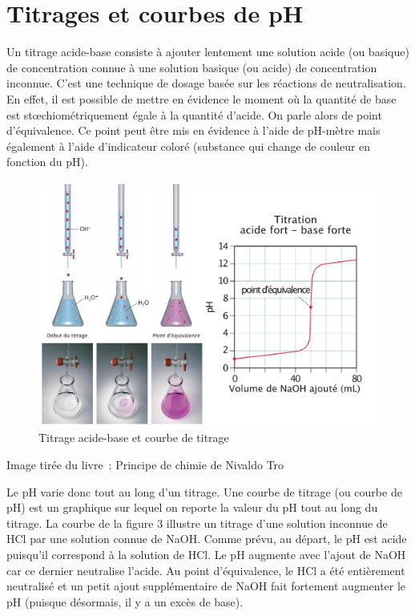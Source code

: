 \documentclass[
  11pt,
  a4paper,
  openany]{book}
\newenvironment{credit}
  {\vspace{-1em}\begin{center}\begin{footnotesize}\begin{textit}}
  {\end{textit}\end{footnotesize}\end{center}}
\begin{document}
\clearpage

\section{Titrages et courbes de pH}\label{titrages-et-courbes-de-ph}

Un titrage acide-base consiste à ajouter lentement une solution acide (ou basique) de concentration connue à une solution basique (ou acide) de concentration inconnue. C'est une technique de dosage basée sur les réactions de neutralisation. En effet, il est possible de mettre en évidence le moment où la quantité de base est stœchiométriquement égale à la quantité d'acide. On parle alors de point d'équivalence. Ce point peut être mis en évidence à l'aide de pH-mètre mais également à l'aide d'indicateur coloré (substance qui change de couleur en fonction du pH).

\begin{figure}

{\centering \includegraphics[width=1\linewidth]{images/acides-bases-5} 

}

\caption{Titrage acide-base et courbe de titrage}\label{fig:acides-bases-5}
\end{figure}

\begin{credit}
Image tirée du livre~: Principe de chimie de Nivaldo Tro

\end{credit}

Le pH varie donc tout au long d'un titrage. Une courbe de titrage (ou courbe de pH) est un graphique sur lequel on reporte la valeur du pH tout au long du titrage. La courbe de la figure 3 illustre un titrage d'une solution inconnue de HCl par une solution connue de NaOH. Comme prévu, au départ, le pH est acide puisqu'il correspond à la solution de HCl. Le pH augmente avec l'ajout de NaOH car ce dernier neutralise l'acide. Au point d'équivalence, le HCl a été entièrement neutralisé et un petit ajout supplémentaire de NaOH fait fortement augmenter le pH (puisque désormais, il y a un excès de base).
\end{document}
